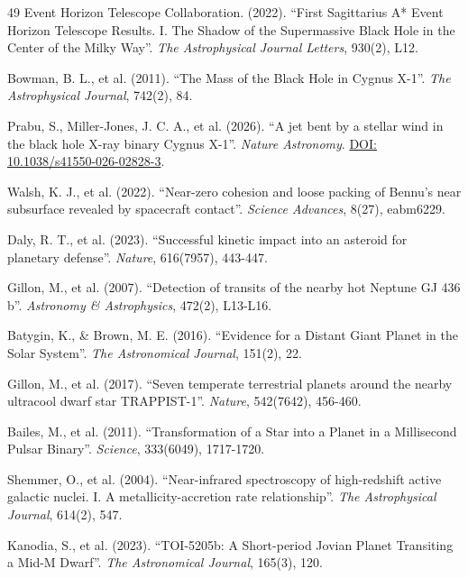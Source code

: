 \documentclass[11pt, a4paper]{article}
\newcommand{\doi}[1]{\href{https://doi.org/#1}{DOI: #1}}
\begin{document}
\begin{thebibliography}{49}
  Event Horizon Telescope Collaboration. (2022). ``First Sagittarius A* Event Horizon Telescope Results. I. The Shadow of the Supermassive Black Hole in the Center of the Milky Way''. \textit{The Astrophysical Journal Letters}, 930(2), L12.

  Bowman, B. L., et al. (2011). ``The Mass of the Black Hole in Cygnus X-1''. \textit{The Astrophysical Journal}, 742(2), 84.

  Prabu, S., Miller-Jones, J. C. A., et al. (2026). ``A jet bent by a stellar wind in the black hole X-ray binary Cygnus X-1''. \textit{Nature Astronomy}.
  \doi{10.1038/s41550-026-02828-3}.

  Walsh, K. J., et al. (2022). ``Near-zero cohesion and loose packing of Bennu's near subsurface revealed by spacecraft contact''. \textit{Science Advances}, 8(27), eabm6229.

  Daly, R. T., et al. (2023). ``Successful kinetic impact into an asteroid for planetary defense''. \textit{Nature}, 616(7957), 443-447.

  Gillon, M., et al. (2007). ``Detection of transits of the nearby hot Neptune GJ 436 b''. \textit{Astronomy \& Astrophysics}, 472(2), L13-L16.

  Batygin, K., \& Brown, M. E. (2016). ``Evidence for a Distant Giant Planet in the Solar System''. \textit{The Astronomical Journal}, 151(2), 22.

  Gillon, M., et al. (2017). ``Seven temperate terrestrial planets around the nearby ultracool dwarf star TRAPPIST-1''. \textit{Nature}, 542(7642), 456-460.

  Bailes, M., et al. (2011). ``Transformation of a Star into a Planet in a Millisecond Pulsar Binary''. \textit{Science}, 333(6049), 1717-1720.

  Shemmer, O., et al. (2004). ``Near-infrared spectroscopy of high-redshift active galactic nuclei. I. A metallicity-accretion rate relationship''. \textit{The Astrophysical Journal}, 614(2), 547.

  Kanodia, S., et al. (2023). ``TOI-5205b: A Short-period Jovian Planet Transiting a Mid-M Dwarf''. \textit{The Astronomical Journal}, 165(3), 120.


\end{thebibliography}
\end{document}
